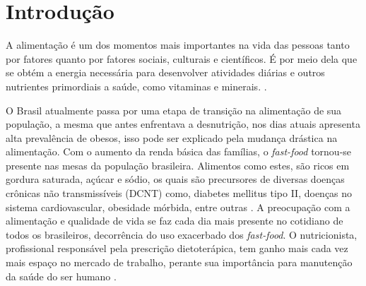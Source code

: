 \documentclass[
	12pt,				%
    oneside,			%
	a4paper,			%
	english,			%
	french,				%
	spanish,			%
	brazil,				%
	]{abntex2}
\begin{document}


\tableofcontents*


\textual


\chapter{Introdução} %



A alimentação é um dos momentos mais importantes na vida das pessoas tanto
por fatores quanto por fatores sociais, culturais e científicos. É
por meio dela que se obtém a energia necessária para desenvolver atividades diárias
e outros nutrientes primordiais a saúde, como vitaminas e minerais. \cite{proenca}.

O Brasil atualmente passa por uma etapa de transição na alimentação de sua
população, a mesma que antes enfrentava a desnutrição, nos dias atuais apresenta
alta prevalência de obesos, isso pode ser explicado pela mudança drástica na
alimentação. Com o aumento da renda básica das famílias, o \textit{fast-food} tornou-se
presente nas mesas da população brasileira. Alimentos como estes, são ricos em
gordura saturada, açúcar e sódio, os quais são precursores de diversas doenças crônicas não
transmissíveis (DCNT) como, diabetes mellitus tipo II, doenças no sistema
cardiovascular, obesidade mórbida, entre outras \cite{schuster}.
A preocupação com a alimentação e qualidade de vida se faz cada
dia mais presente no cotidiano de todos os brasileiros, decorrência do uso exacerbado
dos \textit{fast-food}. O nutricionista, 
profissional responsável pela prescrição dietoterápica, tem ganho mais cada vez mais espaço no mercado de
trabalho, perante sua importância para manutenção da saúde do ser humano
\cite{brasil}.
\end{document}
